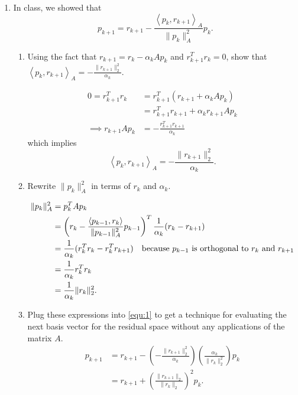 \documentclass[a4paper,12pt]{article}
\newcommand{\norm}[1]{\lVert #1 \rVert}
\newcommand{\inner}[1]{\left\langle #1 \right\rangle}
\begin{document}
\begin{enumerate}[label = \arabic*)]
	\item In class, we showed that
	\begin{equation}
		p_{k+1} = r_{k+1}- \frac{\inner{p_k,r_{k+1}}_A}{\norm{p_k}_A^2}p_k. \label{equ:1}
	\end{equation}
	\begin{enumerate}[label = (\alph*)]
		\item Using the fact that $ r_{k+1} = r_k - \alpha_k A p_k $ and $ r_{k+1}^T r_k = 0 $, show that $ \inner{p_k, r_{k+1}}_A = -\frac{\norm{r_{k+1}}_2^2}{\alpha_k} $.
		
		\begin{align*}
			0 = r_{k+1}^T r_k &= r_{k+1}^T (r_{k+1} + \alpha_k A p_k) \\
			&= r_{k+1}^T r_{k+1} + \alpha_k r_{k+1} A p_k \\
			\implies r_{k+1} A p_k &= -\frac{r_{k+1}^T r_{k+1}}{\alpha_k}
		\end{align*}
		which implies
		\[
			\inner{p_k, r_{k+1}}_A = -\frac{\norm{r_{k+1}}_2^2}{\alpha_k}.
		\]
		
		\item Rewrite $ \norm{p_k}_A^2 $ in terms of $ r_k $ and $ \alpha_k $.
		
		\begin{align*}
			\norm{p_k}_A^2 &= p_k^T A p_k \\
			&= \left(r_k - \frac{\inner{p_{k-1}, r_k}}{\norm{p_{k-1}}_A^2} p_{k-1} \right)^T \frac{1}{\alpha_k}(r_k - r_{k+1}) \\
			&= \frac{1}{\alpha_k}(r_k^T r_k - r_k^Tr_{k+1}) \quad \text{because $ p_{k-1} $ is orthogonal to $ r_k $ and $ r_{k+1} $} \\
			&= \frac{1}{\alpha_k}r_k^T r_k \\
			&= \frac{1}{\alpha_k} \norm{r_k}_2^2.
		\end{align*}
		
		\item Plug these expressions into \eqref{equ:1} to get a technique for evaluating the next basis vector for the residual space without any applications of the matrix $ A $.
		\begin{align*}
			p_{k+1} &= r_{k+1} - \left(-\frac{\norm{r_{k+1}}_2^2}{\alpha_k}\right)\left(\frac{\alpha_k}{\norm{r_k}_2^2}\right) p_k \\
			&= r_{k+1} + \left(\frac{\norm{r_{k+1}}_2}{\norm{r_k}_2}\right)^2 p_k.
		\end{align*}
	\end{enumerate}


\end{enumerate}
\end{document}
